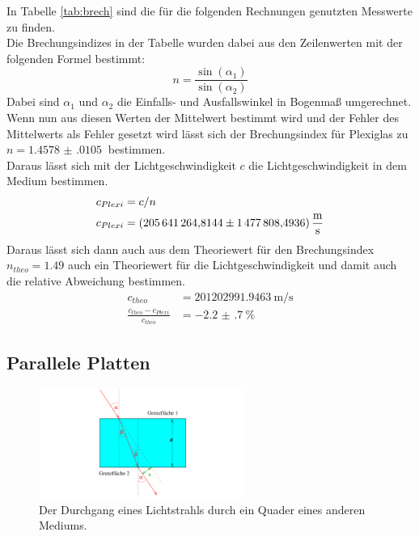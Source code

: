 \noindent In Tabelle \ref{tab:brech} sind die für die folgenden Rechnungen genutzten Messwerte zu finden.\\
Die Brechungsindizes in der Tabelle wurden dabei aus den Zeilenwerten mit der folgenden Formel bestimmt:
\begin{equation*}
    n=\frac{\sin(\alpha_1)}{\sin(\alpha_2)}
\end{equation*}
Dabei sind $\alpha_1$ und $\alpha_2$ die Einfalls- und Ausfallswinkel in Bogenmaß umgerechnet.
Wenn nun aus diesen Werten der Mittelwert bestimmt wird und der Fehler des Mittelwerts als Fehler gesetzt 
wird lässt sich der Brechungsindex für Plexiglas zu $n= \SI{1.4578(0105)}{}$ bestimmen.\\
Daraus lässt sich mit der Lichtgeschwindigkeit $c$\cite{c} die Lichtgeschwindigkeit in dem Medium bestimmen.
\begin{align*}
    c_{Plexi}&=c/n \\
    c_{Plexi}&= \SI{205641264.8144 (14778084936)}{\metre\per\second}
\end{align*}
Daraus lässt sich dann auch aus dem Theoriewert für den Brechungsindex $n_{theo}=1.49$\cite{n} auch ein Theoriewert für die Lichtgeschwindigkeit und damit auch die relative Abweichung bestimmen.
\begin{align*}
    c_{theo}&=\SI{201202991.9463}{\metre\per\second}\\
    \frac{c_{theo}-c_{Plexi}}{c_{theo}}&=\SI{-2.2(7)}{\percent}
\end{align*}

\subsection{Parallele Platten}

\begin{figure}[h]
    \centering
    \includegraphics[width=0.6\textwidth]{latex/images/Platten.PNG}
    \caption{Der Durchgang eines Lichtstrahls durch ein Quader eines anderen Mediums.}
    \label{img:platt}
\end{figure}


